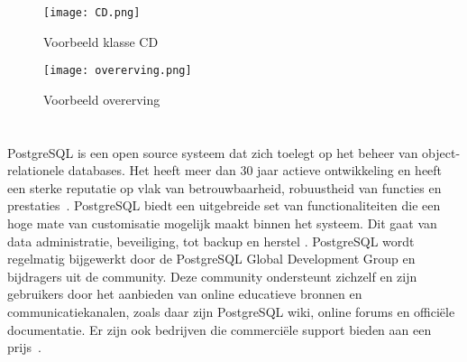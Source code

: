 \begin{figure}[!h]
    \centering
    \texttt{[image: CD.png]}
    \caption{Voorbeeld klasse CD}
    \label{fig:Voorbeeld klasse CD}
\end{figure}

\begin{figure}[!h]
    \centering
    \texttt{[image: overerving.png]}
    \caption{Voorbeeld overerving}
    \label{fig:Voorbeeld overerving}
\end{figure}


\section{}
\label{sec:PostgreSQL}


PostgreSQL is een open source systeem dat zich toelegt op het beheer van object-relationele databases. Het heeft meer dan 30 jaar actieve ontwikkeling en heeft een sterke reputatie op vlak van betrouwbaarheid, robuustheid van functies en prestaties~\autocite{postgres}. PostgreSQL biedt een uitgebreide set van functionaliteiten die een hoge mate van customisatie mogelijk maakt binnen het systeem. Dit gaat van data administratie, beveiliging, tot backup en herstel . PostgreSQL wordt regelmatig bijgewerkt door de PostgreSQL Global Development Group en bijdragers uit de community. Deze community ondersteunt zichzelf en zijn gebruikers door het aanbieden van online educatieve bronnen en communicatiekanalen, zoals daar zijn PostgreSQL wiki, online forums en officiële documentatie. Er zijn ook bedrijven die commerciële support bieden aan een prijs~\autocite{Nethosting2019}. 

